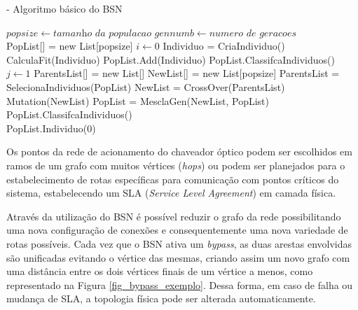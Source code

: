 \documentclass[12pt]{article}
\begin{document}
\begin{algorithm} [h]
\caption{ - Algoritmo básico do BSN}
\begin{algorithmic}[1]
\State $popsize\gets \textit{tamanho da populacao}$
\State $gennumb\gets \textit{numero de geracoes}$\\
\State PopList[] = new List[popsize]
\State $i\gets 0$
\State Individuo = CriaIndividuo()
\State CalculaFit(Individuo)\label{bsn:fitness_line}
\State PopList.Add(Individuo)
\State PopList.ClassifcaIndividuos()
\EndWhile{}\\
\State $j\gets 1$
\State ParentsList[] = new List[]
\State NewList[] = new List[popsize]
\State ParentsList = SelecionaIndividuos(PopList)
\State NewList = CrossOver(ParentsList)
\State Mutation(NewList)
\State PopList = MesclaGen(NewList, PopList)
\State PopList.ClassifcaIndividuos()
\EndWhile\\
\State\Return PopList.Individuo(0)
\end{algorithmic}
\label{pseudocode_bsn}
\end{algorithm}

Os pontos da rede de acionamento do chaveador óptico podem ser escolhidos em ramos de um grafo com muitos vértices (\emph{hops}) ou podem ser planejados para o estabelecimento de rotas específicas para comunicação com pontos críticos do sistema, estabelecendo um SLA (\emph{Service Level Agreement}) em camada física.

Através da utilização do BSN é possível reduzir o grafo da rede possibilitando uma nova configuração de conexões e consequentemente uma nova variedade de rotas possíveis. Cada vez que o BSN ativa um \emph{bypass}, as duas arestas envolvidas são unificadas evitando o vértice das mesmas, criando assim um novo grafo com uma distância entre os dois vértices finais de um vértice a menos, como representado na Figura \ref{fig_bypass_exemplo}. Dessa forma, em caso de falha ou mudança de SLA, a topologia física pode ser alterada automaticamente.
\end{document}
